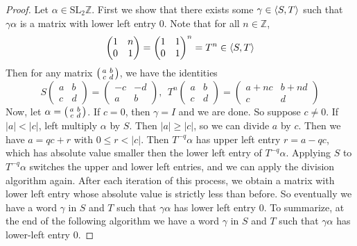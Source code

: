 \documentclass[12pt,twoside]{reedthesis}
\theoremstyle{definition}
\newcommand{\Z}{\mathbb{Z}}
\newcommand{\SLZ}{\mathrm{SL}_2{\Z}}
\DeclarePairedDelimiter\ang{\langle}{\rangle}
\begin{document}
\begin{proof}
  Let $\alpha \in \SLZ$.
  First we show that there exists some $\gamma \in \ang{S,T}$ such that $\gamma\alpha$ is a matrix with lower left entry 0.
  Note that for all $n \in \Z$,
  \begin{equation*}
    \begin{pmatrix}
      1 & n \\
      0 & 1
    \end{pmatrix}
    = \begin{pmatrix}
      1 & 1 \\
      0 & 1
    \end{pmatrix}^n
    = T^n \in \ang{S,T}
  \end{equation*}
  Then for any matrix $\begin{psmallmatrix}a & b \\ c & d\end{psmallmatrix}$, we have the identities
  \begin{equation*}
    S \begin{pmatrix}
      a & b \\
      c & d
    \end{pmatrix}
    = \begin{pmatrix}
      -c & -d \\
      a & b
    \end{pmatrix},\ \
    T^n \begin{pmatrix}
      a & b \\
      c & d
    \end{pmatrix}
    = \begin{pmatrix}
      a + nc & b + nd \\
      c & d
    \end{pmatrix}
  \end{equation*}
  Now, let $\alpha = \begin{psmallmatrix}a & b \\ c & d\end{psmallmatrix}$.
  If $c = 0$, then $\gamma = I$ and we are done.
  So suppose $c \neq 0$.
  If $|a| < |c|$, left multiply $\alpha$ by $S$.
  Then $|a| \geq |c|$, so we can divide $a$ by $c$.
  Then we have $a = qc + r$ with $0 \leq r < |c|$.
  Then $T^{-q} \alpha$ has upper left entry $r = a - qc$, which has absolute value smaller then the lower left entry of $T^{-q} \alpha$.
  Applying $S$ to $T^{-q} \alpha$ switches the upper and lower left entries, and we can apply the division algorithm again.
  After each iteration of this process, we obtain a matrix with lower left entry whose absolute value is strictly less than before.
  So eventually we have a word $\gamma$ in $S$ and $T$ such that $\gamma\alpha$ has lower left entry 0.
  To summarize, at the end of the following algorithm we have a word $\gamma$ in $S$ and $T$ such that $\gamma \alpha$ has lower-left entry 0.
  

\end{proof}
\end{document}
